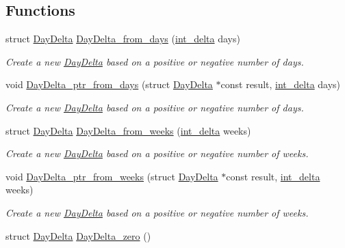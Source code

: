 \subsection*{Functions}
\begin{DoxyCompactItemize}
\item 
struct \hyperlink{structDayDelta}{Day\-Delta} \hyperlink{day-delta_8h_a50a5b111e380372e918e4d67f4b1814d}{Day\-Delta\-\_\-from\-\_\-days} (\hyperlink{types_8h_a8a67cf99971c5cfeeaa2380ba84a4c92}{int\-\_\-delta} days)
\begin{DoxyCompactList}\small\item\em Create a new \hyperlink{structDayDelta}{Day\-Delta} based on a positive or negative number of days. \end{DoxyCompactList}\item 
void \hyperlink{day-delta_8h_a196d880e550d8423bc6314894010e744}{Day\-Delta\-\_\-ptr\-\_\-from\-\_\-days} (struct \hyperlink{structDayDelta}{Day\-Delta} $\ast$const result, \hyperlink{types_8h_a8a67cf99971c5cfeeaa2380ba84a4c92}{int\-\_\-delta} days)
\begin{DoxyCompactList}\small\item\em Create a new \hyperlink{structDayDelta}{Day\-Delta} based on a positive or negative number of days. \end{DoxyCompactList}\item 
struct \hyperlink{structDayDelta}{Day\-Delta} \hyperlink{day-delta_8h_ac44c70541cf4f255f25384194341ff07}{Day\-Delta\-\_\-from\-\_\-weeks} (\hyperlink{types_8h_a8a67cf99971c5cfeeaa2380ba84a4c92}{int\-\_\-delta} weeks)
\begin{DoxyCompactList}\small\item\em Create a new \hyperlink{structDayDelta}{Day\-Delta} based on a positive or negative number of weeks. \end{DoxyCompactList}\item 
void \hyperlink{day-delta_8h_a6a006f452867d3828a3eb69a8f5ba1dd}{Day\-Delta\-\_\-ptr\-\_\-from\-\_\-weeks} (struct \hyperlink{structDayDelta}{Day\-Delta} $\ast$const result, \hyperlink{types_8h_a8a67cf99971c5cfeeaa2380ba84a4c92}{int\-\_\-delta} weeks)
\begin{DoxyCompactList}\small\item\em Create a new \hyperlink{structDayDelta}{Day\-Delta} based on a positive or negative number of weeks. \end{DoxyCompactList}\item 
struct \hyperlink{structDayDelta}{Day\-Delta} \hyperlink{day-delta_8h_ab87d828518fe1bdc7e7662be3e5e6289}{Day\-Delta\-\_\-zero} ()

\end{DoxyCompactItemize}

